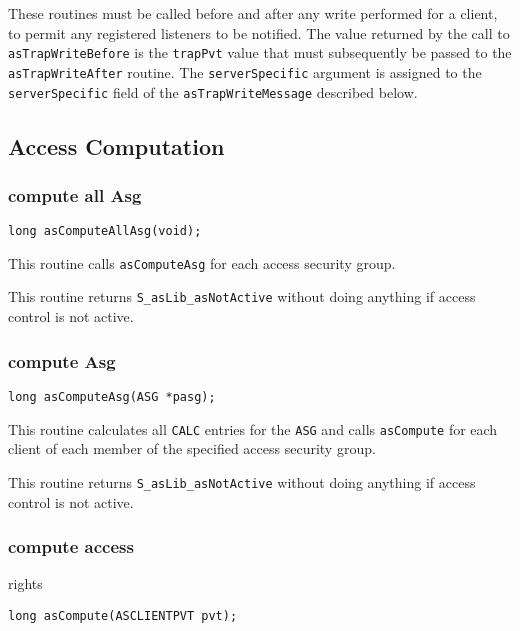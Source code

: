 These routines must be called before and after any write performed for a client, to permit any registered listeners to be notified.
The value returned by the call to \verb|asTrapWriteBefore| is the \verb|trapPvt| value that must subsequently be passed to the \verb|asTrapWriteAfter| routine.
The \verb|serverSpecific| argument is assigned to the \verb|serverSpecific| field of the \verb|asTrapWriteMessage| described below.

\subsection{Access Computation}

\subsubsection{compute all Asg}

\begin{verbatim}
long asComputeAllAsg(void);
\end{verbatim}

This routine calls \verb|asComputeAsg| for each access security group.

This routine returns \verb|S_asLib_asNotActive| without doing anything if access control is not active.

\subsubsection{compute Asg}

\begin{verbatim}
long asComputeAsg(ASG *pasg); 
\end{verbatim}

This routine calculates all \verb|CALC| entries for the \verb|ASG| and calls \verb|asCompute| for each client of each member of the specified access security group.

This routine returns \verb|S_asLib_asNotActive| without doing anything if access control is not active.

\subsubsection{compute access}

rights

\begin{verbatim}
long asCompute(ASCLIENTPVT pvt); 
\end{verbatim}

